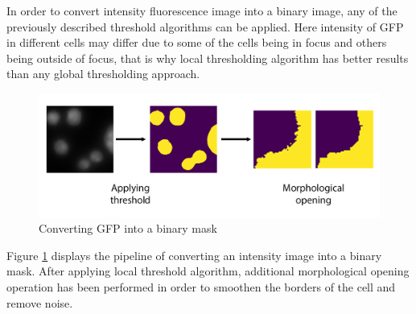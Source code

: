 In order to convert intensity fluorescence image into a binary image, any of the previously described threshold algorithms can be applied. Here intensity of GFP in different cells may differ due to some of the cells being in focus and others being outside of focus, that is why local thresholding algorithm has better results than any global thresholding approach.
\begin{figure}[H]
	\begin{center}
		\includegraphics[width=0.5\linewidth]{bilder/gfp/binary-bce/preprocessing/preprocessing-gfp.png}
		\caption{Converting GFP into a binary mask}\label{fig:gfp-binary}
	\end{center}
\end{figure}

Figure \ref{fig:gfp-binary} displays the pipeline of converting an intensity image into a binary mask. After applying local threshold algorithm, additional morphological opening operation has been performed in order to smoothen the borders of the cell and remove noise. 